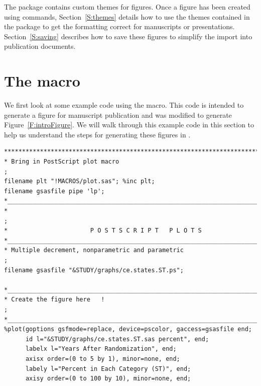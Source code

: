 \documentclass[nojss]{jss}\usepackage[]{graphicx}\usepackage[]{color}
\begin{document}
The  package contains custom themes for figures. Once a figure has been created using  commands, Section~\ref{S:themes} details how to use the themes contained in the  package to get the formatting correct for manuscripts or presentations. Section~\ref{S:saving} describes how to save these figures to simplify the import into publication documents.


\section[The plot.sas macro]{The  macro}\label{S:plot.sas}

We first look at some example code using the  macro. This code is intended to generate a figure for manuscript publication and was modified to generate Figure~\ref{F:introFigure}. We will walk through this example code in this section to help us understand the steps for generating these figures in .

\begin{lstlisting}[float,floatplacement=!htpb, caption={plot.sas commands: Figure setup.},label={plot.sas:figureSetup}]
%let STUDY=/studies/cardiac/valves/aortic/replacement/partner_publication_office/partner1b/mortality_5y
*****************************************************************************;
* Bring in PostScript plot macro                                             ;
filename plt "!MACROS/plot.sas"; %inc plt;
filename gsasfile pipe 'lp';
*____________________________________________________________________________;
*                                                                            ;
*                       P O S T S C R I P T   P L O T S
*____________________________________________________________________________;
* Multiple decrement, nonparametric and parametric                           ;
filename gsasfile "&STUDY/graphs/ce.states.ST.ps";

*____________________________________________________________________________;
* Create the figure here   !                                                 ;
*____________________________________________________________________________;
%plot(goptions gsfmode=replace, device=pscolor, gaccess=gsasfile end;
      id l="&STUDY/graphs/ce.states.ST.sas percent", end;
      labelx l="Years After Randomization", end;
      axisx order=(0 to 5 by 1), minor=none, end;
      labely l="Percent in Each Category (ST)", end;
      axisy order=(0 to 100 by 10), minor=none, end;
\end{lstlisting}
\end{document}
